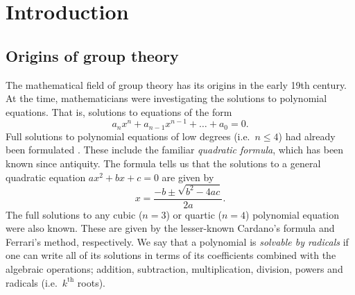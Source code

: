 \section*{Introduction}
\subsection*{Origins of group theory}
The mathematical field of group theory has its origins in the early 19th century.
At the time, mathematicians were investigating the solutions to polynomial equations.
That is, solutions to equations of the form
\[
	a_nx^n + a_{n-1}x^{n-1} + \ldots + a_0 = 0.
\]
Full solutions to polynomial equations of low degrees (i.e.\ $n \leq 4$) had already been formulated \cite{Riggs96}.
These include the familiar \emph{quadratic formula}, which has been known since antiquity.
The formula tells us that the solutions to a general quadratic equation $ax^2 + bx + c = 0$ are given by
\[
	x = \frac{-b\pm\sqrt{b^2-4ac}}{2a}.
\]
The full solutions to any cubic ($n=3$) or quartic ($n=4$) polynomial equation were also known.
These are given by the lesser-known Cardano's formula and Ferrari's method, respectively.
We say that a polynomial is \emph{solvable by radicals} if one can write all of its solutions in terms of its coefficients combined with the algebraic operations; addition, subtraction, multiplication, division, powers and radicals (i.e.\ $k^\text{th}$ roots).

